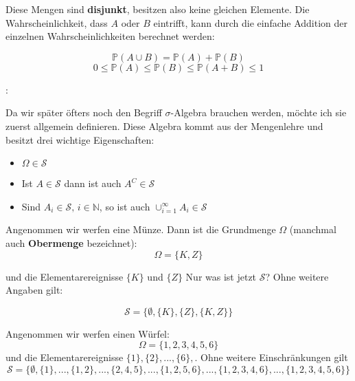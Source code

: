 {    Diese Mengen sind \textbf{disjunkt}, besitzen also keine gleichen Elemente. Die
    Wahrscheinlichkeit, dass $A$ oder $B$ eintrifft, kann durch die einfache
    Addition der einzelnen Wahrscheinlichkeiten berechnet werden:

    \begin{equation*}
        \mathbb{P}(A\cup B)=\mathbb{P}\left(A\right)+\mathbb{P}\left(B\right)
    \end{equation*}
    \begin{equation*}
        0\le \mathbb{P}\left(A\right)\le \mathbb{P}\left(B\right)\le \mathbb{P}\left(A+B\right)\le 1
    \end{equation*}
    \begin{definition}:

        Da wir später öfters noch den Begriff  $\sigma$-Algebra brauchen werden, möchte ich
        sie zuerst allgemein definieren. Diese Algebra kommt aus der
        Mengenlehre und besitzt drei wichtige Eigenschaften:

        \begin{itemize}
            \item $\Omega \in \mathcal S$
            \item Ist $A\in \mathcal S$ dann ist auch $A^{C}\in \mathcal S$
            \item Sind $A_{i}\in \mathcal S,\,i\in \mathbb{N}$, so ist auch $\cup _{i=1}^{{\infty}}A_{i}\in \mathcal S$
        \end{itemize}
    \end{definition}
    Angenommen wir werfen eine Münze. Dann ist die Grundmenge $\Omega$ 
    (manchmal auch \textbf{Obermenge} bezeichnet):
    \begin{equation*}
        \Omega =\{K,Z\}
    \end{equation*}

    und die Elementarereignisse $\{K\}$ und $\{Z\}$ Nur was ist jetzt $\mathcal S$? Ohne
    weitere Angaben gilt:

    \begin{equation*}
        \mathcal S=\{\emptyset,\{K\},\{Z\},\{K,Z\}\}
    \end{equation*}


    \begin{bsp}\label{bsp:wuerfel}
        Angenommen wir werfen einen Würfel:
        \begin{equation*}
            \Omega=\{1,2,3,4,5,6\}
        \end{equation*}
        und die Elementarereignisse $\{1\},\{2\},...,\{6\},$. Ohne weitere Einschränkungen gilt
        \[\mathcal S=\{\emptyset,\{1\},...,\{1,2\},...,\{2,4,5\},...,\{1,2,5,6\},...,\{1,2,3,4,6\},...,\{1,2,3,4,5,6\}\}\]


\end{bsp}}

